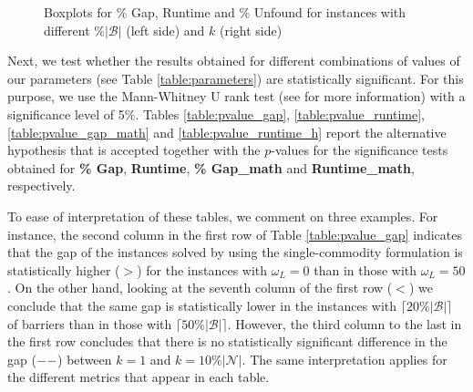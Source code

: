 \documentclass[a4paper,  review, authoryear, 1p.]{elsarticle}
\newcommand{\JP}[1]{{\color{blue}#1}}
\begin{document}
		\begin{figure}[h!]
			\centering
			\caption{Boxplots for \% Gap, Runtime and \% Unfound for instances with different $\%|\mathcal B|$ (left side) and $k$ (right side)}

			
			\label{fig:results_percentage}
					
		\end{figure}

		\JP{
		
		Next, we test whether the results obtained for different combinations of values of our parameters (see Table \ref{table:parameters}) are statistically significant. For this purpose, we use the Mann-Whitney U rank test (see \cite{mcknight2010} for more information) with a significance level of 5\%. Tables \ref{table:pvalue_gap}, \ref{table:pvalue_runtime}, \ref{table:pvalue_gap_math} and \ref{table:pvalue_runtime_h} report the alternative hypothesis that is accepted together with the $p$-values for the significance tests obtained for \textbf{\% Gap}, \textbf{Runtime}, \textbf{\% Gap\_{math}} and \textbf{Runtime\_{math}}, respectively.

		To ease of interpretation of these tables, we comment on three examples. For instance, the second column in the first row of Table \ref{table:pvalue_gap} indicates that 
 the gap of the instances solved by using the single-commodity formulation is statistically higher ($>$) for the instances with $\omega_L=0$ than in those with $\omega_L=50$. On the other hand, looking at the seventh column of the first row ($<$) we conclude that the same gap is statistically lower in the instances with $\lceil 20 \%|\mathcal B|\rceil$ of barriers than in those with $\lceil 50 \%|\mathcal B|\rceil$. However, the third column to the last in the first row concludes that there is no statistically significant difference in the gap ($\---$) between $k=1$ and $k=10\%|\mathcal N|$. The same interpretation applies for the different metrics that appear in each table.
 		
}
\end{document}
